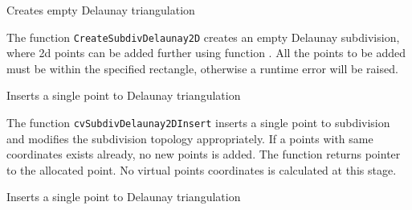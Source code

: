 \label{CreateSubdivDelaunay2D}

Creates empty Delaunay triangulation


\begin{description}
\end{description}

The function \texttt{CreateSubdivDelaunay2D} creates an empty Delaunay
subdivision, where 2d points can be added further using function
. All the points to be added must be within
the specified rectangle, otherwise a runtime error will be raised.

\label{SubdivDelaunay2DInsert}

Inserts a single point to Delaunay triangulation


\begin{description}
\end{description}

The function \texttt{cvSubdivDelaunay2DInsert} inserts a single point to subdivision and modifies the subdivision topology appropriately. If a points with same coordinates exists already, no new points is added. The function returns pointer to the allocated point. No virtual points coordinates is calculated at this stage.

\label{Subdiv2DLocate}

Inserts a single point to Delaunay triangulation


